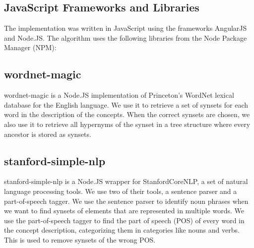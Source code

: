 \subsection{JavaScript Frameworks and Libraries}

The implementation was written in JavaScript using the frameworks AngularJS and Node.JS. The algorithm uses the following libraries from the Node Package Manager (NPM):
\subsection{wordnet-magic}
wordnet-magic is a Node.JS implementation of Princeton's WordNet lexical database for the English language. We use it to retrieve a set of synsets for each word in the description of the concepts. When the correct synsets are chosen, we also use it to retrieve all hypernyms of the synset in a tree structure where every ancestor is stored as synsets. 

\subsection{stanford-simple-nlp}
stanford-simple-nlp is a Node.JS wrapper for StanfordCoreNLP, a set of natural language processing tools. We use two of their tools, a sentence parser and a part-of-speech tagger. We use the sentence parser to identify noun phrases when we want to find synsets of elements that are represented in multiple words. We use the part-of-speech tagger to find the part of speech (POS) of every word in the concept description, categorizing them in categories like nouns and verbs. This is used to remove synsets of the wrong POS.








